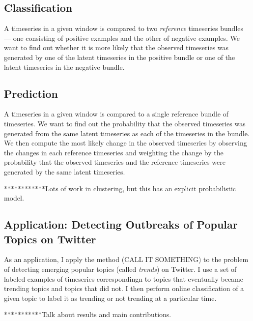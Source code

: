 \subsection{Classification}
A timeseries in a given window is compared to two {\em reference} timeseries bundles --- one consisting of positive examples and the other of negative examples. We want to find out whether it is more likely that the observed timeseries was generated by one of the latent timeseries in the positive bundle or one of the latent timeseries in the negative bundle.

\subsection{Prediction} A timeseries in a given window is compared to a single reference bundle of timeseries. We want to find out the probability that the observed timeseries was generated from the same latent timeseries as each of the timeseries in the bundle. We then compute the most likely change in the observed timeseries by observing the changes in each reference timeseries and weighting the change by the probability that the observed timeseries and the reference timeseries were generated by the same latent timeseries.
 
************Lots of work in clustering, but this has an explicit probabilistic model.

\subsection{Application: Detecting Outbreaks of Popular Topics on Twitter}
As an application, I apply the method (CALL IT SOMETHING) to the problem of detecting emerging popular topics (called {\em trends}) on Twitter. I use a set of labeled examples of timeseries correspondingn to topics that eventually became trending topics and topics that did not. I then perform online classification of a given topic to label it as trending or not trending at a particular time.

***********Talk about results and main contributions.
